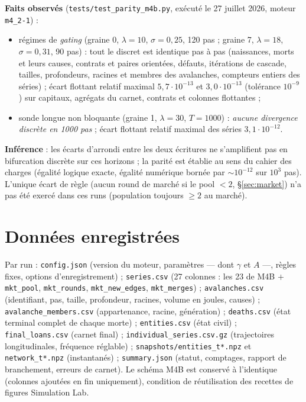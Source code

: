 \documentclass[11pt,a4paper]{article}
\newcommand{\code}[1]{\texttt{#1}}
\begin{document}
\textbf{Faits observés} (\code{tests/test\_parity\_m4b.py}, exécuté le
27 juillet 2026, moteur \code{m4\_2-1}) :
\begin{itemize}
\item régimes de \emph{gating} (graine 0, $\lambda=10$, $\sigma=0{,}25$,
120 pas ; graine 7, $\lambda=18$, $\sigma=0{,}31$, 90 pas) : tout le
discret est identique pas à pas (naissances, morts et leurs causes,
contrats et paires orientées, défauts, itérations de cascade, tailles,
profondeurs, racines et membres des avalanches, compteurs entiers des
séries) ; écart flottant relatif maximal $5{,}7\cdot10^{-13}$ et
$3{,}0\cdot10^{-13}$ (tolérance $10^{-9}$) sur capitaux, agrégats du
carnet, contrats et colonnes flottantes ;
\item sonde longue non bloquante (graine 1, $\lambda=30$, $T=1000$) :
\emph{aucune divergence discrète en 1000 pas} ; écart flottant relatif
maximal des séries $3{,}1\cdot10^{-12}$.
\end{itemize}
\textbf{Inférence} : les écarts d'arrondi entre les deux écritures ne
s'amplifient pas en bifurcation discrète sur ces horizons ; la parité est
établie au sens du cahier des charges (égalité logique exacte, égalité
numérique bornée par $\sim10^{-12}$ sur $10^3$ pas). L'unique écart de
règle (aucun round de marché si le pool $<2$, §\ref{sec:market}) n'a pas
été exercé dans ces runs (population toujours $\ge2$ au marché).

\section{Données enregistrées}

Par run : \code{config.json} (version du moteur, paramètres — dont
$\gamma$ et $A$ —, règles fixes, options d'enregistrement) ;
\code{series.csv} (27 colonnes : les 23 de M4B $+$ \code{mkt\_pool},
\code{mkt\_rounds}, \code{mkt\_new\_edges}, \code{mkt\_merges}) ;
\code{avalanches.csv} (identifiant, pas, taille, profondeur, racines,
volume en joules, causes) ; \code{avalanche\_members.csv} (appartenance,
racine, génération) ; \code{deaths.csv} (état terminal complet de chaque
morte) ; \code{entities.csv} (état civil) ; \code{final\_loans.csv}
(carnet final) ; \code{individual\_series.csv.gz} (trajectoires
longitudinales, fréquence réglable) ; \code{snapshots/entities\_t*.npz} et
\code{network\_t*.npz} (instantanés) ; \code{summary.json} (statut,
comptages, rapport de branchement, erreurs de carnet). Le schéma M4B est
conservé à l'identique (colonnes ajoutées en fin uniquement), condition de
réutilisation des recettes de figures Simulation Lab.
\end{document}
